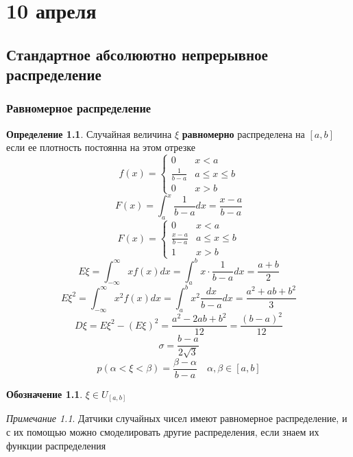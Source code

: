 \documentclass[oneside]{book}
\theoremstyle{plain}
\theoremstyle{remark}
\newtheorem*{remark}{Примечание}
\theoremstyle{definition}
\newtheorem*{definition}{Определение}
\newtheorem*{symb}{Обозначение}
\begin{document}
\chapter{10 апреля}
\label{sec:org4207d5f}
\section{Стандартное абсолюютно непрерывное распределение}
\label{sec:org837a6f3}
\subsection{Равномерное распределение}
\label{sec:org40a4388}
\begin{definition}
Случайная величина \(\xi\) \textbf{равномерно} распределена на \([a, b]\) если ее плотность постоянна на этом отрезке
\[ f(x) = \begin{cases}
0 & x < a \\
\frac{1}{b - a} & a \le x \le b \\
0 & x > b
\end{cases}\]
\[ F(x) = \int_a^x \frac{1}{b - a}dx = \frac{x - a}{b - a} \]
\[ F(x) = \begin{cases}
0 & x < a \\
\frac{x - a}{b - a} & a \le x \le b \\
1 & x > b
\end{cases} \]
\[ E\xi = \int_{-\infty}^\infty x f(x) dx = \int_a^b x \cdot \frac{1}{b - a} dx = \frac{a + b}{2} \]
\[ E\xi^2 = \int_{-\infty}^\infty x^2f(x) dx = \int_a^b x^2 \frac{dx}{b - a}dx = \frac{a^2 + ab + b^2}{3} \]
\[ D\xi = E\xi^2 - (E\xi)^2 = \frac{a^2 - 2ab + b^2}{12} = \frac{(b - a)^2}{12} \]
\[ \sigma = \frac{b - a}{2\sqrt{3}} \]
\[ p(\alpha < \xi < \beta) = \frac{\beta - \alpha}{b - a} \quad \alpha, \beta \in [a, b] \]
\end{definition}
\begin{symb}
\(\xi \in U_{[a, b]}\)
\end{symb}
\begin{remark}
Датчики случайных чисел имеют равномерное распределение, и с их помощью можно смоделировать другие распределения, если знаем их функции распределения
\end{remark}
\end{document}
